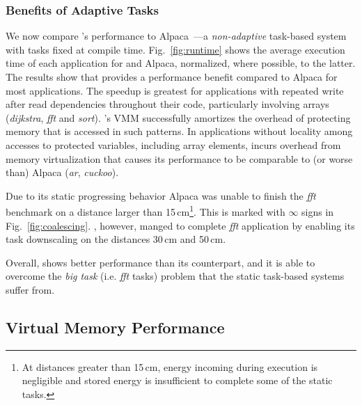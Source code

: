 \subsubsection{Benefits of Adaptive Tasks}
%
We now compare \sys's performance to Alpaca~\cite{alpaca}---a
\emph{non-adaptive} task-based system with tasks fixed at compile time.
Fig.~\ref{fig:runtime} shows the average execution time of each
application for \sys and Alpaca, normalized, where possible, to the latter. The results show
that \sys provides a performance benefit compared to Alpaca for most
applications. The speedup is greatest for applications with repeated write after
read dependencies throughout their code, particularly involving arrays
(\textit{dijkstra}, \textit{fft} and \textit{sort}). \sys's VMM
successfully amortizes the overhead of protecting memory that is accessed in
such patterns.  In applications without locality among accesses to protected
variables, including array elements, \sys incurs overhead from memory
virtualization that causes its performance to be comparable to (or worse than)
Alpaca (\textit{ar}, \textit{cuckoo}).

Due to its static progressing behavior Alpaca was unable to finish the \textit{fft} benchmark on a distance larger than 15\,cm\footnote{At distances greater than 15\,cm, energy incoming during
execution is negligible and stored energy is insufficient to complete some of
the static tasks.}. This is marked with $\infty$ signs in Fig.~\ref{fig:coalescing}. \sys, however, manged to complete \textit{fft} application by enabling its task downscaling on the distances 30\,cm and 50\,cm.
 
Overall, \sys shows better performance than its counterpart, and it is able to overcome the \textit{big task} (i.e. \textit{fft} tasks) problem that the static task-based systems suffer from. 

\subsection{Virtual Memory Performance}
\label{sec:results_memory_management}

